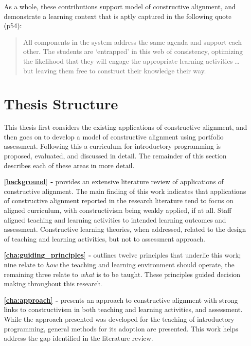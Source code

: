 As a whole, these contributions support \citet{Biggs:1996c} model of constructive alignment, and demonstrate a learning context that is aptly captured in the following quote \citep{Biggs:2007} (p54):

\begin{quote}
	All components in the system address the same agenda and support each other. The students are `entrapped' in this web of consistency, optimizing the likelihood that they will engage the appropriate learning activities \ldots but leaving them free to construct their knowledge their way.
\end{quote}



\section{Thesis Structure} %
\label{sec:thesis_structure}

This thesis first considers the existing applications of constructive alignment, and then goes on to develop a model of constructive alignment using portfolio assessment. Following this a curriculum for introductory programming is proposed, evaluated, and discussed in detail. The remainder of this section describes each of these areas in more detail. 

\textbf{\cref{background} - } provides an extensive literature review of applications of constructive alignment. The main finding of this work indicates that applications of constructive alignment reported in the research literature tend to focus on aligned curriculum, with constructivism being weakly applied, if at all. Staff aligned teaching and learning activities to intended learning outcomes and assessment. Constructive learning theories, when addressed, related to the design of teaching and learning activities, but not to assessment approach.

\textbf{\cref{cha:guiding_principles} - } outlines twelve principles that underlie this work; nine relate to \emph{how} the teaching and learning environment should operate, the remaining three relate to \emph{what} is to be taught. These principles guided decision making throughout this research.

\textbf{\cref{cha:approach} - } presents an approach to constructive alignment with strong links to constructivism in both teaching and learning activities, and assessment. While the approach presented was developed for the teaching of introductory programming, general methods for its adoption are presented. This work helps address the gap identified in the literature review.

